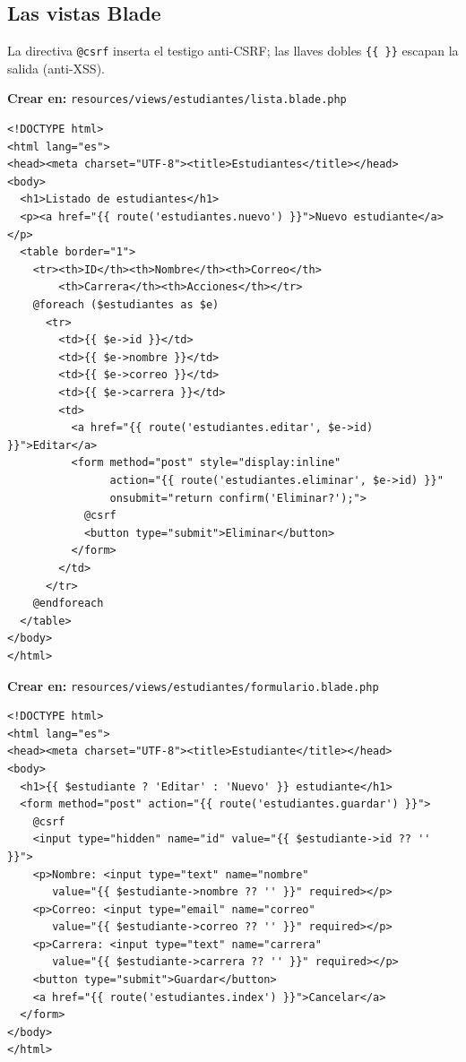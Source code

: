 \documentclass[11pt,a4paper,openany]{book}
\begin{document}
\subsection{Las vistas Blade}
\label{ap:crud:laravel:vistas}

La directiva \texttt{@csrf} inserta el testigo anti-CSRF; las llaves
dobles \texttt{\{\{ \}\}} escapan la salida (anti-XSS).

{\small\textbf{Crear en:} \texttt{resources/views/estudiantes/lista.blade.php}}
\begin{lstlisting}[style=html,caption={lista.blade.php (listado)},label={lst:lv-lista}]
<!DOCTYPE html>
<html lang="es">
<head><meta charset="UTF-8"><title>Estudiantes</title></head>
<body>
  <h1>Listado de estudiantes</h1>
  <p><a href="{{ route('estudiantes.nuevo') }}">Nuevo estudiante</a></p>
  <table border="1">
    <tr><th>ID</th><th>Nombre</th><th>Correo</th>
        <th>Carrera</th><th>Acciones</th></tr>
    @foreach ($estudiantes as $e)
      <tr>
        <td>{{ $e->id }}</td>
        <td>{{ $e->nombre }}</td>
        <td>{{ $e->correo }}</td>
        <td>{{ $e->carrera }}</td>
        <td>
          <a href="{{ route('estudiantes.editar', $e->id) }}">Editar</a>
          <form method="post" style="display:inline"
                action="{{ route('estudiantes.eliminar', $e->id) }}"
                onsubmit="return confirm('Eliminar?');">
            @csrf
            <button type="submit">Eliminar</button>
          </form>
        </td>
      </tr>
    @endforeach
  </table>
</body>
</html>
\end{lstlisting}

{\small\textbf{Crear en:} \texttt{resources/views/estudiantes/formulario.blade.php}}
\begin{lstlisting}[style=html,caption={formulario.blade.php (alta y edicion)},label={lst:lv-form}]
<!DOCTYPE html>
<html lang="es">
<head><meta charset="UTF-8"><title>Estudiante</title></head>
<body>
  <h1>{{ $estudiante ? 'Editar' : 'Nuevo' }} estudiante</h1>
  <form method="post" action="{{ route('estudiantes.guardar') }}">
    @csrf
    <input type="hidden" name="id" value="{{ $estudiante->id ?? '' }}">
    <p>Nombre: <input type="text" name="nombre"
       value="{{ $estudiante->nombre ?? '' }}" required></p>
    <p>Correo: <input type="email" name="correo"
       value="{{ $estudiante->correo ?? '' }}" required></p>
    <p>Carrera: <input type="text" name="carrera"
       value="{{ $estudiante->carrera ?? '' }}" required></p>
    <button type="submit">Guardar</button>
    <a href="{{ route('estudiantes.index') }}">Cancelar</a>
  </form>
</body>
</html>
\end{lstlisting}
\end{document}
